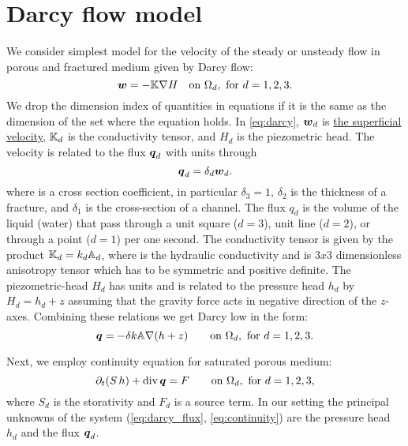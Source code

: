 
\section{Darcy flow model}
We consider simplest model for the velocity of the steady or unsteady flow in porous and fractured medium given by 
Darcy flow:
\begin{equation}
    \label{eq:darcy}
    \vc w = -\tn K \grad H \quad\text{on }\Omega_d,\ \text{for $d=1,2,3$}.
\end{equation}
We drop the dimension index of quantities in equations if it is the same as the dimension of the set where the equation holds.
In \eqref{eq:darcy}, $\mathbf{\boldsymbol{w}}_d$  is \href{http://en.wikipedia.org/wiki/Superficial_velocity}{the superficial velocity},
${\mathbb{K}}_d$ is the conductivity tensor, and $H_d$  is the piezometric head. The velocity is related to the flux $\mathbf{\boldsymbol{q}}_d$ 
with units  through
\[
    \mathbf{\boldsymbol{q}}_d = \delta_d \mathbf{\boldsymbol{w}}_d.
\]
where 
 is a cross section coefficient, in particular $\delta_3=1$, $\delta_2$  is the thickness of a fracture, and $\delta_1$  is the cross-section of a channel.
The flux $q_d$ is the volume of the liquid (water) that pass through a unit square ($d=3$),
unit line ($d=2$), or through a point ($d=1$) per one second. 
The conductivity tensor is given by the product 
${\mathbb{K}}_d = k_d {\mathbb{A}}_d$, where 
 is the hydraulic conductivity  and 
 is 
$3x3$ dimensionless anisotropy tensor which has to be symmetric and positive definite. The piezometric-head $H_d$ has units  and is related to the pressure head
$h_d$ by $H_d = h_d + z$ assuming that the gravity force acts in negative direction of the $z$-axes. 
Combining these relations we get Darcy low in the form:
\begin{equation}
    \label{eq:darcy_flux}
    \vc q = -\delta k\tn A \grad (h+z)  \qquad\text{on }\Omega_d,\ \text{for $d=1,2,3$}.
\end{equation}

Next, we employ continuity equation for saturated porous medium:
\begin{equation}
    \label{eq:continuity}
    \prtl_t (S\, h) + \div \vc q = F \qquad \text{on }\Omega_d,\ \text{for $d=1,2,3$},
\end{equation}
where $S_d$ is the storativity and $F_d$ is a source term. In our setting the principal unknowns of the system 
(\ref{eq:darcy_flux}, \ref{eq:continuity}) are the pressure head $h_d$ and the flux $\mathbf{\boldsymbol{q}}_d$.


